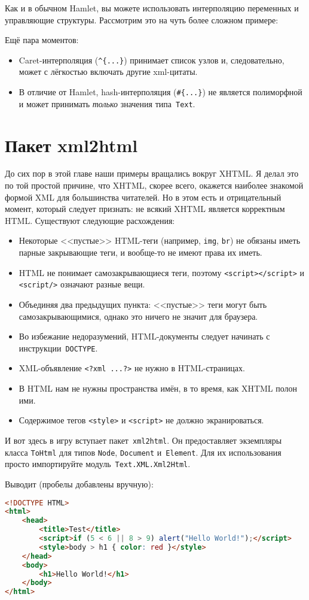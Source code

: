 Как и в обычном Hamlet, вы можете использовать интерполяцию переменных и управляющие структуры. Рассмотрим это на чуть более сложном примере:


Ещё пара моментов:
\begin{itemize}
\item Caret-интерполяция (\verb'^{...}') принимает список узлов и, следовательно, может с лёгкостью включать другие xml-цитаты.
\item В отличие от Hamlet, hash-интерполяция (\verb'#{...}') не является полиморфной и может принимать \emph{только} значения типа~\lstinline!Text!.
\end{itemize}

\section{Пакет xml2html}
До сих пор в этой главе наши примеры вращались вокруг XHTML. Я делал это по той простой причине, что XHTML, скорее всего, окажется наиболее знакомой формой XML для большинства читателей. Но в этом есть и отрицательный момент, который следует признать: не всякий XHTML является корректным HTML. Существуют следующие расхождения:
\begin{itemize}
\item Некоторые <<пустые>> HTML-теги (например, \lstinline!img!, \lstinline!br!) не обязаны иметь парные закрывающие теги, и вообще-то не имеют права их иметь.
\item HTML не понимает самозакрывающиеся теги, поэтому \lstinline!<script></script>! и \lstinline!<script/>! означают разные вещи.
\item Объединяя два предыдущих пункта: <<пустые>> теги могут быть самозакрывающимися, однако это ничего не значит для браузера.
\item Во избежание недоразумений, HTML-документы следует начинать с инструкции~\lstinline!DOCTYPE!.
\item XML-объявление \lstinline!<?xml ...?>! не нужно в HTML-страницах.
\item В HTML нам не нужны пространства имён, в то время, как XHTML полон ими.
\item Содержимое тегов \lstinline!<style>! и \lstinline!<script>! не должно экранироваться. %
\end{itemize}

И вот здесь в игру вступает пакет~\texttt{xml2html}. Он предоставляет экземпляры класса \lstinline!ToHtml! для типов \lstinline!Node!, \lstinline!Document! и~\lstinline!Element!. Для их использования просто импортируйте модуль~\lstinline'Text.XML.Xml2Html'.


Выводит (пробелы добавлены вручную):

\begin{lstlisting}[language=HTML]
<!DOCTYPE HTML>
<html>
    <head>
        <title>Test</title>
        <script>if (5 < 6 || 8 > 9) alert("Hello World!");</script>
        <style>body > h1 { color: red }</style>
    </head>
    <body>
        <h1>Hello World!</h1>
    </body>
</html>
\end{lstlisting}%
